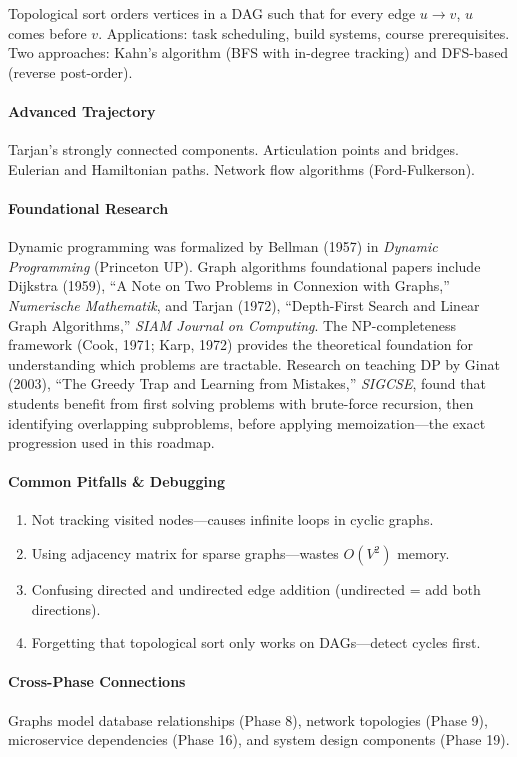 \documentclass[11pt, a4paper, oneside]{report}
\begin{document}
Topological sort orders vertices in a DAG such that for every edge $u \to v$, $u$ comes before $v$. Applications: task scheduling, build systems, course prerequisites. Two approaches: Kahn's algorithm (BFS with in-degree tracking) and DFS-based (reverse post-order).

\paragraph{Advanced Trajectory} Tarjan's strongly connected components. Articulation points and bridges. Eulerian and Hamiltonian paths. Network flow algorithms (Ford-Fulkerson).


\paragraph{Foundational Research} Dynamic programming was formalized by Bellman (1957) in \emph{Dynamic Programming} (Princeton UP). Graph algorithms foundational papers include Dijkstra (1959), ``A Note on Two Problems in Connexion with Graphs,'' \emph{Numerische Mathematik}, and Tarjan (1972), ``Depth-First Search and Linear Graph Algorithms,'' \emph{SIAM Journal on Computing}. The NP-completeness framework (Cook, 1971; Karp, 1972) provides the theoretical foundation for understanding which problems are tractable. Research on teaching DP by Ginat (2003), ``The Greedy Trap and Learning from Mistakes,'' \emph{SIGCSE}, found that students benefit from first solving problems with brute-force recursion, then identifying overlapping subproblems, before applying memoization---the exact progression used in this roadmap.

\paragraph{Common Pitfalls \& Debugging}
\begin{enumerate}[leftmargin=*]
\item Not tracking visited nodes---causes infinite loops in cyclic graphs.
\item Using adjacency matrix for sparse graphs---wastes $O(V^2)$ memory.
\item Confusing directed and undirected edge addition (undirected = add both directions).
\item Forgetting that topological sort only works on DAGs---detect cycles first.
\end{enumerate}

\paragraph{Cross-Phase Connections} Graphs model database relationships (Phase 8), network topologies (Phase 9), microservice dependencies (Phase 16), and system design components (Phase 19).
\end{document}

